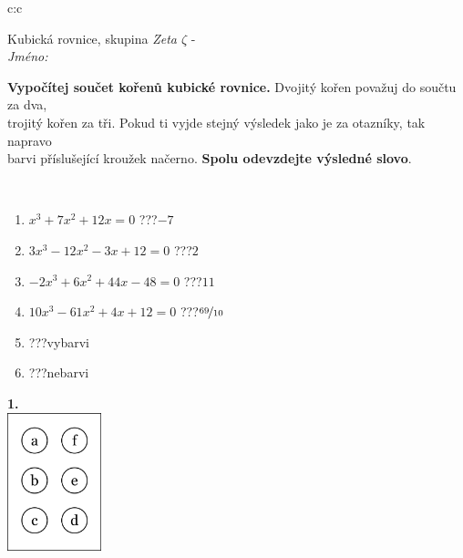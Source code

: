 \documentclass[10pt]{report}
\begin{document}
\begin{tabular}{c:c}
\begin{minipage}[c][104.5mm][t]{0.5\linewidth}
\begin{center}
\vspace{7mm}
{\huge Kubická rovnice, skupina \textit{Zeta $\zeta$} -}\\[5mm]
\textit{Jméno:}\phantom{xxxxxxxxxxxxxxxxxxxxxxxxxxxxxxxxxxxxxxxxxxxxxxxxxxxxxxxxxxxxxxxxx}\\[5mm]
\begin{minipage}{0.95\linewidth}
\begin{center}
\textbf{Vypočítej součet kořenů kubické rovnice.} Dvojitý kořen považuj do součtu za dva,\\trojitý kořen za tři. Pokud ti vyjde stejný výsledek jako je za otazníky, tak napravo\\barvi příslušející kroužek načerno. \textbf{Spolu odevzdejte výsledné slovo}.
\end{center}
\end{minipage}
\\[1mm]
\begin{minipage}{0.79\linewidth}
\begin{center}
\begin{varwidth}{\linewidth}
\begin{enumerate}
\Large
\item $x^3+7x^2+12x=0$\quad \dotfill\; ???\;\dotfill \quad $-7$
\item $3x^3-12x^2-3x+12=0$\quad \dotfill\; ???\;\dotfill \quad $2$
\item $-2x^3+6x^2+44x-48=0$\quad \dotfill\; ???\;\dotfill \quad $11$
\item $10x^3-61x^2+4x+12=0$\quad \dotfill\; ???\;\dotfill \quad $\nicefrac{69}{10}$
\item \quad \dotfill\; ???\;\dotfill \quad vybarvi
\item \quad \dotfill\; ???\;\dotfill \quad nebarvi
\end{enumerate}
\end{varwidth}
\end{center}
\end{minipage}
\begin{minipage}{0.20\linewidth}
\begin{center}
{\Huge\bfseries 1.} \\[2mm]
\includegraphics[height=40mm]{../images/braille.png}

\end{center}
\end{minipage}
\end{center}
\end{minipage}
\end{tabular}
\end{document}
